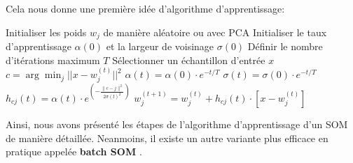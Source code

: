 \documentclass[12pt,a4paper]{report}
\begin{document}
Cela nous donne une première idée d'algorithme d'apprentissage:

\begin{algorithm}[H]
\caption{Algorithme d'apprentissage d'un SOM (stepwise)}
\label{alg:SOM_stepwise}
\begin{algorithmic}[1]
    \State Initialiser les poids $w_j$ de manière aléatoire ou avec PCA
    \State Initialiser le taux d'apprentissage $\alpha(0)$ et la largeur de voisinage $\sigma(0)$
    \State Définir le nombre d'itérations maximum $T$
        \State Sélectionner un échantillon d'entrée $x$
        \State $c = \arg\min_{j} ||x - w_j^{(t)}||^2$ 
        \State $\alpha(t) = \alpha(0) \cdot e^{-t/T}$ 
        \State $\sigma(t) = \sigma(0) \cdot e^{-t/T}$ 
            \State $h_{cj}(t) = \alpha(t) \cdot e^{\left(-\frac{\|c - j\|^2}{2\sigma(t)^2}\right)}$ 
            \State $w_j^{(t+1)} = w_j^{(t)} + h_{cj}(t) \cdot [x - w_j^{(t)}]$ 
        \EndFor
    \EndFor
\end{algorithmic}
\end{algorithm}

Ainsi, nous avons présenté les étapes de l'algorithme d'apprentissage d'un SOM de manière détaillée. Neanmoins, il existe un autre variante plus efficace en
pratique appelée \textbf{batch SOM} \cite{SOM1990}.
\end{document}
